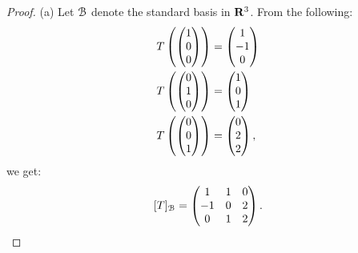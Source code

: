 \documentclass[10pt,twoside,openany]{memoir}
\begin{document}
    {\color{blue} \begin{proof}
        (a) Let $\mathcal{B}$ denote the standard basis in $\mathbf{R}^3$. From the following:
            \begin{equation*}
            \begin{split}
                T \left( \left( \begin{matrix} 1 \\ 0 \\ 0\end{matrix} \right) \right) & = \left( \begin{matrix} 1 \\ -1 \\ 0 \end{matrix} \right) \\
                T \left( \left( \begin{matrix} 0 \\ 1 \\ 0\end{matrix} \right) \right) & = \left( \begin{matrix} 1 \\ 0 \\ 1 \end{matrix} \right) \\
                T \left( \left( \begin{matrix} 0 \\ 0 \\ 1\end{matrix} \right) \right) & = \left( \begin{matrix} 0 \\ 2 \\ 2 \end{matrix} \right), \\
            \end{split}
            \end{equation*}
        we get:
            \begin{equation*}
            \begin{split}
                [T]_{\mathcal{B}} = \left( \begin{matrix} 1 & 1 & 0 \\ -1 & 0 & 2 \\ 0 & 1 & 2 \end{matrix} \right).
            \end{split}
            \end{equation*}


\end{proof}}
\end{document}
